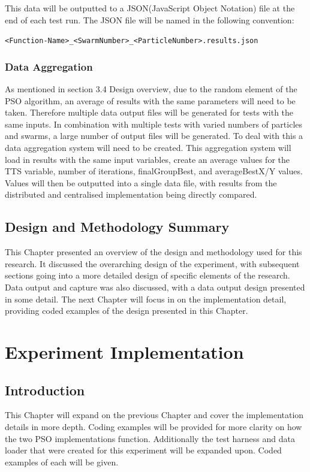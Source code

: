 \documentclass[oneside,12pt]{book}
\begin{document}
This data will be outputted to a JSON(JavaScript Object Notation) file at the end of each test run. The JSON file will be named in the following convention:

\verb|<Function-Name>_<SwarmNumber>_<ParticleNumber>.results.json|


\subsection{Data Aggregation}
As mentioned in section 3.4 Design overview, due to the random element of the PSO algorithm, an average of results with the same parameters will need to be taken. Therefore multiple data output files will be generated for tests with the same inputs. In combination with multiple tests with varied numbers of particles and swarms, a large number of output files will be generated. To deal with this a data aggregation system will need to be created. This aggregation system will load in results with the same input variables, create an average values for the TTS variable, number of iterations, finalGroupBest, and averageBestX/Y values. Values will then be outputted into a single data file, with results from the distributed and centralised implementation being directly compared.

\section{Design and Methodology Summary}
This Chapter presented an overview of the design and methodology used for this research. It discussed the overarching design of the experiment, with subsequent sections going into a more detailed design of specific elements of the research. Data output and capture was also discussed, with a data output design presented in some detail. 
The next Chapter will focus in on the implementation detail, providing coded examples of the design presented in this Chapter. 

\chapter{Experiment Implementation}

\section{Introduction}
This Chapter will expand on the previous Chapter and cover the implementation details in more depth. Coding examples will be provided for more clarity on how the two PSO implementations function. Additionally the test harness and data loader that were created for this experiment will be expanded upon. Coded examples of each will be given.
\end{document}
